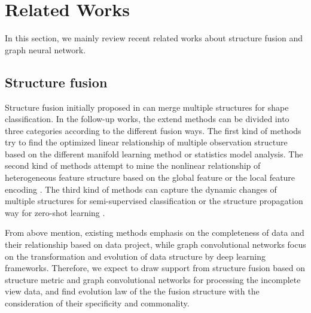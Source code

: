 \documentclass[review]{elsarticle}
\begin{document}
\section{Related Works}
In this section, we mainly review recent related works about structure fusion and graph neural network.

\subsection{Structure fusion}
Structure fusion initially proposed in \cite{Lin20131286}can merge multiple structures for shape classification. In the follow-up works, the extend methods can be divided into three categories according to the different fusion ways. The first kind of methods try to find the optimized linear relationship of multiple observation structure based on the different manifold learning method \cite{Lin2014146} or statistics model analysis\cite{7268821}. The second kind of methods attempt to mine the nonlinear relationship of heterogeneous feature structure based on the global feature\cite{7301305}\cite{Lin20161} or the local feature encoding \cite{Lin2017275}. The third kind of methods can capture the dynamic changes of multiple structures for semi-supervised classification \cite{Lin2017Dynamic}or the structure propagation way for zero-shot learning\cite{Lin2018structure} \cite{lin2018class} \cite{LINGF2018}\cite{lin2019transfer}.

From above mention, existing methods emphasis on the completeness of data and their relationship based on data project, while graph convolutional networks focus on the transformation and evolution of data structure by deep learning frameworks. Therefore, we expect to draw support from structure fusion based on structure metric and graph convolutional networks for processing the incomplete view data, and find evolution law of the the fusion structure with the consideration of their specificity and commonality.
\end{document}
